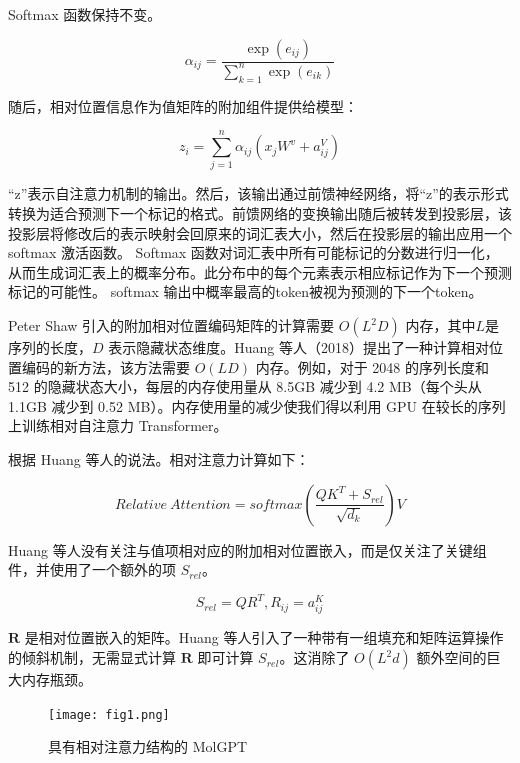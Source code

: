 \begin{translation}
Softmax 函数保持不变。

\begin{equation}
  \alpha_{ij} = \frac{\exp \left( e_{ij} \right)}{\sum_{k=1}^n \exp \left( e_{ik} \right)}
\end{equation}

随后，相对位置信息作为值矩阵的附加组件提供给模型：

\begin{equation}
  z_i = \sum_{j=1}^n \alpha_{ij} \left( x_jW^{v} + a_{ij}^V \right)
\end{equation}

“z”表示自注意力机制的输出。然后，该输出通过前馈神经网络，将“z”的表示形式转换为适合预测下一个标记的格式。前馈网络的变换输出随后被转发到投影层，该投影层将修改后的表示映射会回原来的词汇表大小，然后在投影层的输出应用一个 softmax 激活函数。 Softmax 函数对词汇表中所有可能标记的分数进行归一化，从而生成词汇表上的概率分布。此分布中的每个元素表示相应标记作为下一个预测标记的可能性。 softmax 输出中概率最高的token被视为预测的下一个token。

Peter Shaw 引入的附加相对位置编码矩阵的计算需要 $O(L^2D)$ 内存，其中$L$是序列的长度，$D$ 表示隐藏状态维度。Huang 等人（2018）提出了一种计算相对位置编码的新方法，该方法需要 $O(LD)$ 内存。例如，对于 2048 的序列长度和 512 的隐藏状态大小，每层的内存使用量从 8.5GB 减少到 4.2 MB（每个头从 1.1GB 减少到 0.52 MB）。内存使用量的减少使我们得以利用 GPU 在较长的序列上训练相对自注意力 Transformer。

根据 Huang 等人的说法。相对注意力计算如下：

\begin{equation}
  Relative\ Attention = softmax \left( \frac{QK^T + S_{rel}}{\sqrt{d_k}} \right)V
\end{equation}

Huang 等人没有关注与值项相对应的附加相对位置嵌入，而是仅关注了关键组件，并使用了一个额外的项 $S_{rel}$。

\begin{equation}
  S_{rel} = QR^T, R_{ij} = a_{ij}^K
\end{equation}

$\boldsymbol{R}$ 是相对位置嵌入的矩阵。Huang 等人引入了一种带有一组填充和矩阵运算操作的倾斜机制，无需显式计算 $\boldsymbol{R}$ 即可计算 $S_{rel}$。这消除了 $O(L^2d)$ 额外空间的巨大内存瓶颈。

\begin{figure}[H]
  \centering
  \texttt{[image: fig1.png]}
  \caption{具有相对注意力结构的 MolGPT}
  \label{fig:1}
\end{figure}



\end{translation}
